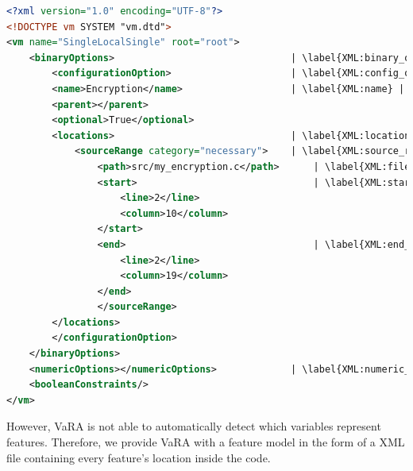 \begin{minipage}{\linewidth}
\begin{lstlisting}[caption={Feature model of \autoref{alg:Vara_feature_regions} in XML},language=XML,label={alg:Encrypton_feature_model_xml},escapechar=|]
<?xml version="1.0" encoding="UTF-8"?>
<!DOCTYPE vm SYSTEM "vm.dtd">
<vm name="SingleLocalSingle" root="root">
    <binaryOptions>                               | \label{XML:binary_option} |
        <configurationOption>                     | \label{XML:config_option} |
        <name>Encryption</name>                   | \label{XML:name} |
        <parent></parent>
        <optional>True</optional>
        <locations>                               | \label{XML:location} |
            <sourceRange category="necessary">    | \label{XML:source_range} |
                <path>src/my_encryption.c</path>      | \label{XML:file_path} |
                <start>                               | \label{XML:start_variable} |
                    <line>2</line>
                    <column>10</column>
                </start>
                <end>                                 | \label{XML:end_variable} |
                    <line>2</line>
                    <column>19</column>
                </end>
                </sourceRange>
        </locations>
        </configurationOption>
    </binaryOptions>
    <numericOptions></numericOptions>             | \label{XML:numeric_option} |
    <booleanConstraints/>
</vm>
\end{lstlisting}
\end{minipage}

However, VaRA is not able to automatically detect which variables represent features. 
Therefore, we provide VaRA with a feature model in the form of a \textsc{XML} file containing every feature's location inside the code.

